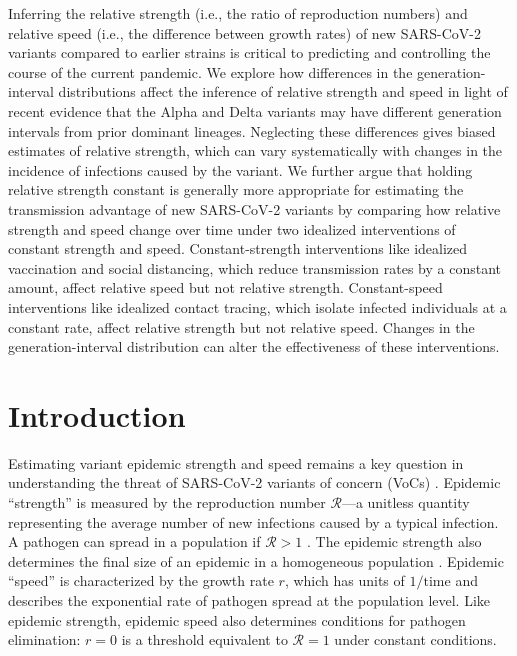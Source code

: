 \documentclass[12pt]{article}
\newcommand{\RR}{\ensuremath{{\mathcal R}}\xspace}
\begin{document}
Inferring the relative strength (i.e., the ratio of reproduction numbers) and relative speed (i.e., the difference between growth rates) of new SARS-CoV-2 variants compared to earlier strains is critical to predicting and controlling the course of the current pandemic.
We explore how differences in the generation-interval distributions affect the inference of relative strength and speed in light of recent evidence that the Alpha and Delta variants may have different generation intervals from prior dominant lineages.
Neglecting these differences gives biased estimates of relative strength, which can vary systematically with changes in the incidence of infections caused by the variant.
We further argue that holding relative strength constant is generally more appropriate for estimating the transmission advantage of new SARS-CoV-2 variants by comparing how relative strength and speed change over time under two idealized interventions of constant strength and speed.
Constant-strength interventions like idealized vaccination and social distancing, which reduce transmission rates by a constant amount, affect relative speed but not relative strength.
Constant-speed interventions like idealized contact tracing, which isolate infected individuals at a constant rate, affect relative strength but not relative speed.
Changes in the generation-interval distribution can alter the effectiveness of these interventions.

\section{Introduction}

Estimating variant epidemic strength and speed remains a key question in understanding the threat of SARS-CoV-2 variants of concern (VoCs) \cite{switzerland2021variant,davies2021estimated,di2021impact,graham2021changes,leung2021early,volz2021transmission,zhao2021,campbell2021increased}.
Epidemic ``strength'' is measured by the reproduction number $\RR$---a unitless quantity representing the average number of new infections caused by a typical infection. 
A pathogen can spread in a population if $\RR>1$ \citep{diekmann1990definition}.
The epidemic strength also determines the final size of an epidemic in a homogeneous population \citep{anderson1991infectious}.
Epidemic ``speed'' is characterized by the growth rate $r$, which has units of $1/\mathrm{time}$ and describes the exponential rate of pathogen spread at the population level.
Like epidemic strength, epidemic speed also determines conditions for pathogen elimination: $r=0$ is a threshold equivalent to $\RR=1$ under constant conditions.
\end{document}

